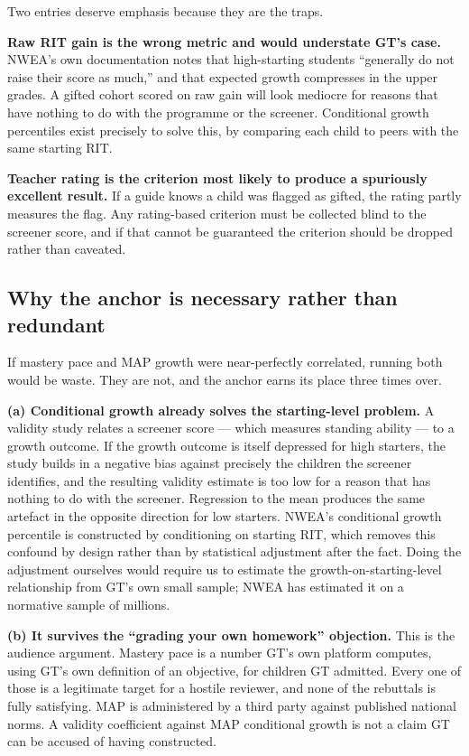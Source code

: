 \documentclass[11pt,a4paper]{article}
\begin{document}
Two entries deserve emphasis because they are the traps.

\textbf{Raw RIT gain is the wrong metric and would understate GT's case.}
NWEA's own documentation notes that high-starting students ``generally do not
raise their score as much,'' and that expected growth compresses in the upper
grades. A gifted cohort scored on raw gain will look mediocre for reasons that
have nothing to do with the programme or the screener. Conditional growth
percentiles exist precisely to solve this, by comparing each child to peers with
the same starting RIT.

\textbf{Teacher rating is the criterion most likely to produce a spuriously
excellent result.} If a guide knows a child was flagged as gifted, the rating
partly measures the flag. Any rating-based criterion must be collected blind to
the screener score, and if that cannot be guaranteed the criterion should be
dropped rather than caveated.

\subsection{Why the anchor is necessary rather than redundant}
\label{sec:anchor}

If mastery pace and MAP growth were near-perfectly correlated, running both
would be waste. They are not, and the anchor earns its place three times over.

\textbf{(a) Conditional growth already solves the starting-level problem.} A
validity study relates a screener score --- which measures standing ability ---
to a growth outcome. If the growth outcome is itself depressed for high
starters, the study builds in a negative bias against precisely the children the
screener identifies, and the resulting validity estimate is too low for a reason
that has nothing to do with the screener. Regression to the mean produces the
same artefact in the opposite direction for low starters. NWEA's conditional
growth percentile is constructed by conditioning on starting RIT, which removes
this confound by design rather than by statistical adjustment after the fact.
Doing the adjustment ourselves would require us to estimate the
growth-on-starting-level relationship from GT's own small sample; NWEA has
estimated it on a normative sample of millions.

\textbf{(b) It survives the ``grading your own homework'' objection.} This is
the audience argument. Mastery pace is a number GT's own platform computes,
using GT's own definition of an objective, for children GT admitted. Every one
of those is a legitimate target for a hostile reviewer, and none of the
rebuttals is fully satisfying. MAP is administered by a third party against
published national norms. A validity coefficient against MAP conditional growth
is not a claim GT can be accused of having constructed.
\end{document}
